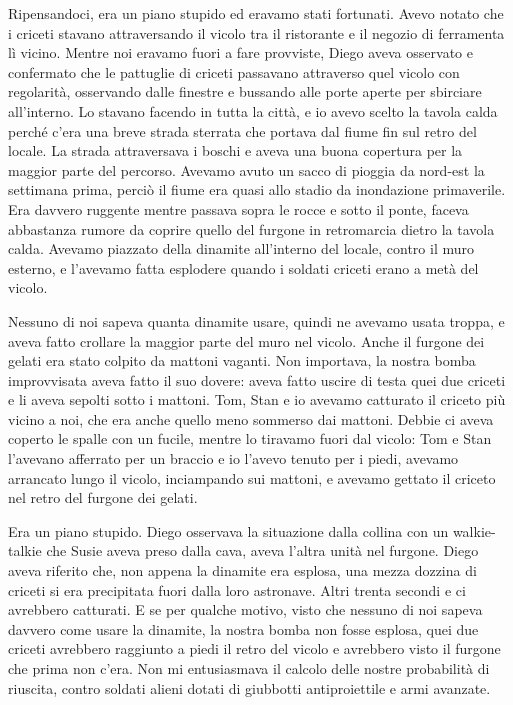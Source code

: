Ripensandoci, era un piano stupido ed eravamo stati fortunati. Avevo
notato che i criceti stavano attraversando il vicolo tra il ristorante e
il negozio di ferramenta lì vicino. Mentre noi eravamo fuori a fare
provviste, Diego aveva osservato e confermato che le pattuglie di
criceti passavano attraverso quel vicolo con regolarità, osservando
dalle finestre e bussando alle porte aperte per sbirciare all'interno.
Lo stavano facendo in tutta la città, e io avevo scelto la tavola calda
perché c'era una breve strada sterrata che portava dal fiume fin sul
retro del locale. La strada attraversava i boschi e aveva una buona
copertura per la maggior parte del percorso. Avevamo avuto un sacco di
pioggia da nord-est la settimana prima, perciò il fiume era quasi allo
stadio da inondazione primaverile. Era davvero ruggente mentre passava
sopra le rocce e sotto il ponte, faceva abbastanza rumore da coprire
quello del furgone in retromarcia dietro la tavola calda. Avevamo
piazzato della dinamite all'interno del locale, contro il muro esterno,
e l'avevamo fatta esplodere quando i soldati criceti erano a metà del
vicolo.

Nessuno di noi sapeva quanta dinamite usare, quindi ne avevamo usata
troppa, e aveva fatto crollare la maggior parte del muro nel vicolo.
Anche il furgone dei gelati era stato colpito da mattoni vaganti. Non
importava, la nostra bomba improvvisata aveva fatto il suo dovere: aveva
fatto uscire di testa quei due criceti e li aveva sepolti sotto i
mattoni. Tom, Stan e io avevamo catturato il criceto più vicino a noi,
che era anche quello meno sommerso dai mattoni. Debbie ci aveva coperto
le spalle con un fucile, mentre lo tiravamo fuori dal vicolo: Tom e Stan
l'avevano afferrato per un braccio e io l'avevo tenuto per i piedi,
avevamo arrancato lungo il vicolo, inciampando sui mattoni, e avevamo
gettato il criceto nel retro del furgone dei gelati.

Era un piano stupido. Diego osservava la situazione dalla collina con un
walkie-talkie che Susie aveva preso dalla cava, aveva l'altra unità nel
furgone. Diego aveva riferito che, non appena la dinamite era esplosa,
una mezza dozzina di criceti si era precipitata fuori dalla loro
astronave. Altri trenta secondi e ci avrebbero catturati. E se per
qualche motivo, visto che nessuno di noi sapeva davvero come usare la
dinamite, la nostra bomba non fosse esplosa, quei due criceti avrebbero
raggiunto a piedi il retro del vicolo e avrebbero visto il furgone che
prima non c'era. Non mi entusiasmava il calcolo delle nostre probabilità
di riuscita, contro soldati alieni dotati di giubbotti antiproiettile e
armi avanzate.

